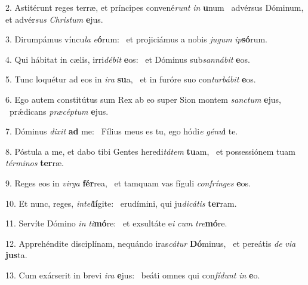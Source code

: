 2. Astitérunt reges terræ, et príncipes convené\textit{runt} \textit{in} \textbf{u}num \ast\  advérsus Dóminum, et advér\textit{sus} \textit{Chris}\textit{tum} \textbf{e}jus.\

3. Dirumpámus víncu\textit{la} \textit{e}\textbf{ó}rum: \ast\  et projiciámus a nobis \textit{ju}\textit{gum} \textit{ip}\textbf{só}rum.\

4. Qui hábitat in cælis, irri\textit{dé}\textit{bit} \textbf{e}os: \ast\  et Dóminus sub\textit{san}\textit{ná}\textit{bit} \textbf{e}os.\

5. Tunc loquétur ad eos in \textit{i}\textit{ra} \textbf{su}a, \ast\  et in furóre suo con\textit{tur}\textit{bá}\textit{bit} \textbf{e}os.\

6. Ego autem constitútus sum Rex ab eo super Sion montem \textit{sanc}\textit{tum} \textbf{e}jus, \ast\  prǽdicans \textit{præ}\textit{cép}\textit{tum} \textbf{e}jus.\

7. Dóminus \textit{di}\textit{xit} \textbf{ad} me: \ast\  Fílius meus es tu, ego hódi\textit{e} \textit{gé}\textit{nu}\textbf{i} te.\

8. Póstula a me, et dabo tibi Gentes heredi\textit{tá}\textit{tem} \textbf{tu}am, \ast\  et possessiónem tuam \textit{tér}\textit{mi}\textit{nos} \textbf{ter}ræ.\

9. Reges eos in \textit{vir}\textit{ga} \textbf{fér}rea, \ast\  et tamquam vas fíguli \textit{con}\textit{frín}\textit{ges} \textbf{e}os.\

10. Et nunc, reges, \textit{in}\textit{tel}\textbf{lí}gite: \ast\  erudímini, qui ju\textit{di}\textit{cá}\textit{tis} \textbf{ter}ram.\

11. Servíte Dómino \textit{in} \textit{ti}\textbf{mó}re: \ast\  et exsultáte e\textit{i} \textit{cum} \textit{tre}\textbf{mó}re.\

12. Apprehéndite disciplínam, nequándo iras\textit{cá}\textit{tur} \textbf{Dó}minus, \ast\  et pereátis \textit{de} \textit{vi}\textit{a} \textbf{jus}ta.\

13. Cum exárserit in brevi \textit{i}\textit{ra} \textbf{e}jus: \ast\  beáti omnes qui con\textit{fí}\textit{dunt} \textit{in} \textbf{e}o.\

